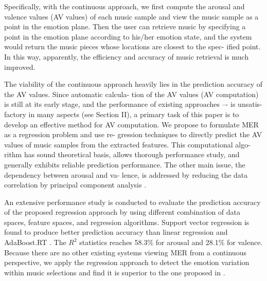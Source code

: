 \documentclass[journal, twoside]{IEEEtran}
\begin{document}
Specifically, with the continuous approach, we first compute
the arousal and valence values (AV values) of each music sample
and view the music sample as a point in the emotion plane. Then
the user can retrieve music by specifying a point in the emotion
plane according to his/her emotion state, and the system would
return the music pieces whose locations are closest to the spec-
ified point. In this way, apparently, the efficiency and accuracy
of music retrieval is much improved.

The viability of the continuous approach heavily lies in the
prediction accuracy of the AV values. Since automatic calcula-
tion of the AV values (AV computation) is still at its early stage,
and the performance of existing approaches \cite{8}–-\cite{11} is unsatis-
factory in many aspects (see Section II), a primary task of this
paper is to develop an effective method for AV computation. We
propose to formulate MER as a regression problem and use re-
gression techniques to directly predict the AV values of music
samples from the extracted features. This computational algo-
rithm has sound theoretical basis, allows thorough performance
study, and generally exhibits reliable prediction performance.
The other main issue, the dependency between arousal and va-
lence, is addressed by reducing the data correlation by principal
component analysis \cite{16}.

An extensive performance study is conducted to evaluate the
prediction accuracy of the proposed regression approach by
using different combination of data spaces, feature spaces, and
regression algorithms. Support vector regression \cite{18} is found
to produce better prediction accuracy than linear regression
\cite{17} and AdaBoost.RT \cite{20}. The $R^2$
statistics \cite{17} reaches
58.3\% for arousal and 28.1\% for valence. Because there are
no other existing systems viewing MER from a continuous
perspective, we apply the regression approach to detect the
emotion variation within music selections and find it is superior
to the one proposed in \cite{10}.
\end{document}
